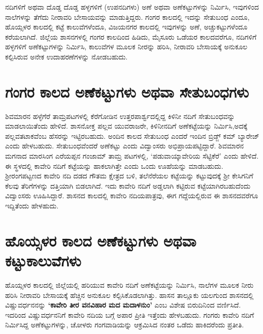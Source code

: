 ನದಿಗಳಿಗೆ ಅಥವಾ ದೊಡ್ಡ ದೊಡ್ಡ ಹಳ್ಳಗಳಿಗೆ (ಉಪನದಿಗಳು) ಅಣೆ ಅಥವಾ ಅಣೆಕಟ್ಟುಗಳನ್ನು ನಿರ್ಮಿಸಿ, ಇವುಗಳಿಂದ ನಾಲೆಗಳನ್ನು ತೆಗೆದು ನೀರಾವರಿ ಬೇಸಾಯವನ್ನು ಮಾಡುತ್ತಿದ್ದರು. ಗಂಗರ ಕಾಲದಲ್ಲಿ ಇದನ್ನು ಸೇತುಬಂಧ ಎಂದೂ, ಹೊಯ್ಸಳರ ಕಾಲದಲ್ಲಿ ಕಟ್ಟೆ ಕಾಲುವೆಗಳೆಂದೂ, ವಿಜಯನಗರ ಕಾಲದಲ್ಲಿ ಇವುಗಳನ್ನು ಅಣೆ, ಅಚ್ಚುಕಟ್ಟುಗಳೆಂದೂ ಕರೆಯಲಾಗಿದೆ. ಜಿಲ್ಲೆಯ ಶಾಸನಗಳಲ್ಲಿ ಗಂಗರ ಕಾಲದಿಂದ ಹಿಡಿದು, ಮೈಸೂರು ಒಡೆಯರ ಕಾಲದವರೆಗೂ, ನದಿಗಳಿಗೆ ಹಳ್ಳಗಳಿಗೆ ಅಣೆಕಟ್ಟು\-ಗಳನ್ನು ನಿರ್ಮಿಸಿ, ಕಾಲುವೆಗಳ ಮೂಲಕ ನೀರನ್ನು ಹರಿಸಿ, ನೀರಾವರಿ ಬೇಸಾಯಕ್ಕೆ ಅನುಕೂಲ ಕಲ್ಪಿಸಿರುವ ಅನೇಕ ಉದಾ\-ಹರಣೆಗಳನ್ನು ನೋಡಬಹುದು.

\section*{ಗಂಗರ ಕಾಲದ ಅಣೆಕಟ್ಟುಗಳು ಅಥವಾ ಸೇತುಬಂಧಗಳು}

ಶಿವಮಾರನ ಹಳ್ಳೆಗೆರೆ ತಾಮ್ರಪಟಗಳಲ್ಲಿ ಕೆರೆಗೋಡಿನ ಉತ್ತರಪಾರ್ಶ್ವದಲ್ಲಿದ್ದ ಕಿಳಿನೀ ನದಿಗೆ ಸೇತುಬಂಧವನ್ನು ಮಾಡಲಾಯಿತೆಂದು ಹೇಳಿದೆ. ಶಾಸನೋಕ್ತ ಪಲ್ಲವ ಯುವರಾಜರೇ, ಕಿಳಿನೀನದಿಗೆ ಅಣೆಕಟ್ಟೆಯನ್ನು ನಿರ್ಮಿಸಿ,ಅದಕ್ಕೆ ಪಲ್ಲವತಟಾಕವೆಂಬ ಹೆಸರನ್ನು ಇಟ್ಟಿರಬಹುದು. ಅಂದಿನ ಕಾಲದ ಸೇತುಬಂಧ ಎಂದರೆ ಇಂದಿನ ಬ್ರಿಡ್ಜ್​ ಕಮ್ ಬ್ಯಾರೇಜ್​ ಎಂದು ಹೇಳಬಹುದು. ಸೇತುಬಂಧವೆಂದರೆ ಅಣೆಕಟ್ಟು ಎಂದು ವಿದ್ವಾಂಸರು ಅಭಿಪ್ರಾಯಪಟ್ಟಿದ್ದಾರೆ. ಶಿವಮಾರನ ಮಗನಾದ ಮಾರಸಿಂಗ ಎರೆಯಪ್ಪನ ಗಂಜಾಮ್ ತಾಮ್ರ ಪಟಗಳಲ್ಲಿ, ‘ಪಡುವಾಯ್ಕಾವೇರಿಯ ಸೆಟ್ಟಿಕೆರೆ’ ಎಂದು ಹೇಳಿದೆ. ಈ ಸ್ಥಳದಲ್ಲಿ ಕಾವೇರಿ ನದಿಗೆ ಕಟ್ಟೆಯನ್ನು ಹಾಕಲಾಗಿತ್ತೇ ಎಂದು ಒಂದು ಊಹೆಯನ್ನು ಮಾಡಬಹುದು. ಶ‍್ರೀರಂಗಪಟ್ಟಣದ ಕಾವೇರಿ ನದಿ ದಡದ ಗೌತಮ ಕ್ಷೇತ್ರದ ಬಳಿ, ತಲೆನೆರೆಯಲ ಕಟ್ಟೆಯನ್ನು ಕಟ್ಟುವುದಕ್ಕೆ ಶ‍್ರೀ ಕೇಸಿಗನಿಗೆ ಕೆಲವು ತೆರಿಗೆಗಳನ್ನು ದತ್ತಿಯಾಗಿ ಬಿಡಲಾಗಿದೆ. ಇದು ಕಾವೇರಿ ನದಿಗೆ ಅಡ್ಡಲಾಗಿ ಕಟ್ಟಿರುವ ಕಟ್ಟೆಯಾಗಿರಬಹುದೆಂದು ವಿದ್ವಾಂಸರು ಊಹಿಸಿದ್ದಾರೆ. ಶಾಸನದ ಕಾಲದಲ್ಲಿ ಕಾವೇರಿ ನದಿಯಪಾತ್ರವು, ಈಗ ಗದ್ದೆಯಲ್ಲಿರುವ ಈ ಶಾಸನದವರೆಗೂ ಇದ್ದಿತೆಂದು ಹೇಳಹುದು.

\section*{ಹೊಯ್ಸಳರ ಕಾಲದ ಅಣೆಕಟ್ಟುಗಳು ಅಥವಾ ಕಟ್ಟುಕಾಲುವೆಗಳು}

ಹೊಯ್ಸಳರ ಕಾಲದಲ್ಲಿ ಜಿಲ್ಲೆಯಲ್ಲಿ ಹರಿಯುವ ಕಾವೇರಿ ನದಿಗೆ ಅಣೆಕಟ್ಟೆಯನ್ನು ನಿರ್ಮಿಸಿ, ನಾಲೆಗಳ ಮೂಲಕ ನೀರು ಹರಿಸಿ ನೀರಾವರಿ ಬೇಸಾಯಕ್ಕೆ ಹೆಚ್ಚಿನ ಅನುಕೂಲ ಕಲ್ಪಿಸಿಕೊಡಲಾಗಿತ್ತು. ಹಾಸನ ತಾಲ್ಲೂಕು ಯಲಗುಂದ ಶಾಸನದಲ್ಲಿ ವಿಷ್ಣುವರ್ಧನನನ್ನು \textbf{‘ಕಾವೇರಿ ತೀರ ವನವಿಹಾರ ಮದ ಮದಾಳನುಂ’} ಎಂಬ ವಿಶೇಷ ಬಿರುದಿನಿಂದ ವರ್ಣಿಸಿದೆ. ಇದರಿಂದ ವಿಷ್ಣುವರ್ಧನನಿಗೆ ಕಾವೇರಿ ನದಿಯ ಬಗ್ಗೆ ಅಪಾರ ಪ್ರೀತಿ ಇತ್ತೆಂದು ಹೇಳಬಹುದು. ಗಂಗರು ಕಾವೇರಿ ನದಿಗೆ ನಿರ್ಮಿಸಿದ್ದ ಅಣೆಕಟ್ಟುಗಳನ್ನು, ಚೋಳರು ಗಂಗವಾಡಿಯನ್ನು ಆಕ್ರಮಿಸಿದ ನಂತರ ಒಡೆದು ಹಾಕಿದರೆಂದು ಪ್ರತೀತಿ.

